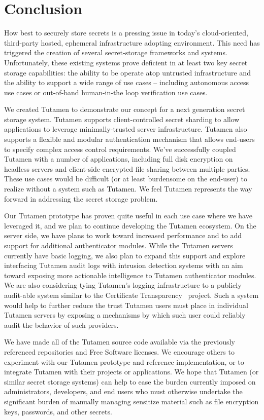 \section{Conclusion}
\label{sec:conclusion}

How best to securely store secrets is a pressing issue in today's
cloud-oriented, third-party hosted, ephemeral infrastructure adopting
environment. This need has triggered the creation of several
secret-storage frameworks and systems. Unfortunately, these existing
systems prove deficient in at least two key secret storage
capabilities: the ability to be operate atop untrusted infrastructure
and the ability to support a wide range of use cases -- including
autonomous access use cases or out-of-band human-in-the loop
verification use cases.

We created Tutamen to demonstrate our concept for a next generation
secret storage system. Tutamen supports client-controlled secret
sharding to allow applications to leverage minimally-trusted server
infrastructure. Tutamen also supports a flexible and modular
authentication mechanism that allows end-users to specify complex
access control requirements. We've successfully coupled Tutamen with a
number of applications, including full disk encryption on headless
servers and client-side encrypted file sharing between multiple
parties. These use cases would be difficult (or at least burdensome on
the end-user) to realize without a system such as Tutamen. We feel
Tutamen represents the way forward in addressing the secret storage
problem.

Our Tutamen prototype has proven quite useful in each use case where
we have leveraged it, and we plan to continue developing the Tutamen
ecosystem. On the server side, we have plans to work toward increased
performance and to add support for additional authenticator
modules. While the Tutamen servers currently have basic logging, we
also plan to expand this support and explore interfacing Tutamen audit
logs with intrusion detection systems with an aim toward exposing more
actionable intelligence to Tutamen authenticator modules. We are also
considering tying Tutamen's logging infrastructure to a publicly
audit-able system similar to the Certificate
Transparency~\cite{laurie2013} project. Such a system would help to
further reduce the trust Tutamen users must place in individual
Tutamen servers by exposing a mechanisms by which such user could
reliably audit the behavior of such providers.

We have made all of the Tutamen source code available via the
previously referenced repositories and Free Software licenses. We
encourage others to experiment with our Tutamen prototype and
reference implementation, or to integrate Tutamen with their projects
or applications. We hope that Tutamen (or similar secret storage
systems) can help to ease the burden currently imposed on
administrators, developers, and end users who must otherwise undertake
the significant burden of manually managing sensitize material such as
file encryption keys, passwords, and other secrets.

